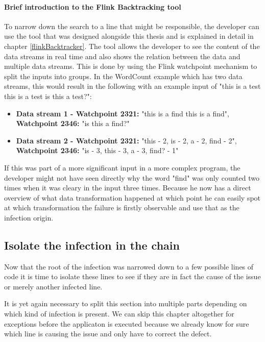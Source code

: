 \pagebreak

\paragraph{Brief introduction to the Flink Backtracking tool}
\label{mdfBriefIntroTool}

To narrow down the search to a line that might be responsible, the developer can use the tool that was designed alongside this thesis and is explained in detail in chapter \ref{flinkBacktracker}. The tool allows the developer to see the content of the data streams in real time and also shows the relation between the data and multiple data streams. This is done by using the Flink watchpoint mechanism to split the inputs into groups. In the WordCount example which has two data streams, this would result in the following with an example input of "this is a test this is a test is this a test?":

\begin{itemize}
  \item \textbf{Data stream 1 - Watchpoint 2321:} "this is a find this is a find", \textbf{Watchpoint 2346:} "is this a find?"
  \item \textbf{Data stream 2 - Watchpoint 2321:} "this - 2, is - 2, a - 2, find - 2", \textbf{Watchpoint 2346:} "is - 3, this - 3, a - 3, find? - 1"
\end{itemize}

If this was part of a more significant input in a more complex program, the developer might not have seen directly why the word "find" was only counted two times when it was cleary in the input three times. Because he now has a direct overview of what data transformation happened at which point he can easily spot at which transformation the failure is firstly observable and use that as the infection origin.

\subsection{Isolate the infection in the chain}
\label{mdfIsolateInfection}
Now that the root of the infection was narrowed down to a few possible lines of code it is time to isolate these lines to see if they are in fact the cause of the issue or merely another infected line.

It is yet again necessary to split this section into multiple parts depending on which kind of infection is present. We can skip this chapter altogether for exceptions before the applicaton is executed because we already know for sure which line is causing the issue and only have to correct the defect.

